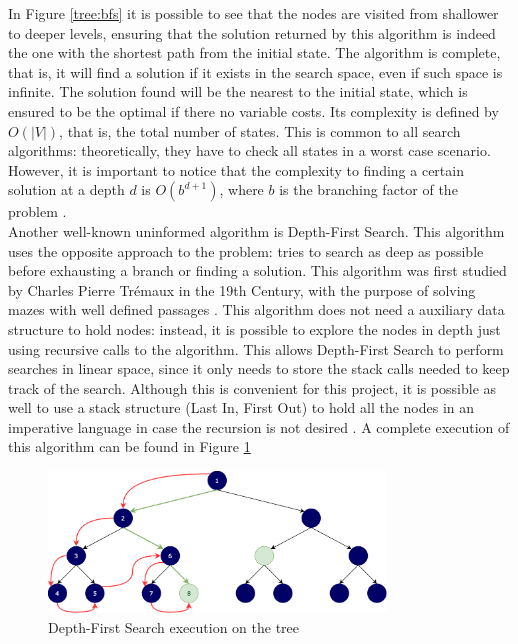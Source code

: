 In Figure \ref{tree:bfs} it is possible to see that the nodes are visited from
shallower to deeper levels, ensuring that the solution returned by this
algorithm is indeed the one with the shortest path from the initial state. The
algorithm is complete, that is, it will find a solution if it exists in the
search space, even if such space is infinite. The solution found will be the
nearest to the initial state, which is ensured to be the optimal if there no
variable costs. Its complexity is defined by $O(|V|)$, that is, the total
number of states. This is common to all search algorithms: theoretically, they
have to check all states in a worst case scenario. However, it is important to
notice that the complexity to finding a certain solution at a depth $d$ is
$O(b^{d+1})$, where $b$ is the branching factor of the problem
\cite{rusell-2003-aima}.\\

Another well-known uninformed algorithm is Depth-First Search. This algorithm
uses the opposite approach to the problem: tries to search as deep as possible
before exhausting a branch or finding a solution. This algorithm was first
studied by Charles Pierre Trémaux in the 19th Century, with the purpose of
solving mazes with well defined passages \cite{even-2011-graph}. This algorithm
does not need a auxiliary data structure to hold nodes: instead, it is possible
to explore the nodes in depth just using recursive calls to the algorithm. This
allows Depth-First Search to perform searches in linear space, since it only
needs to store the stack calls needed to keep track of the search. Although
this is convenient for this project, it is possible as well to use a stack
structure (Last In, First Out) to hold all the nodes in an imperative language
in case the recursion is not desired \cite{rusell-2003-aima}. A complete
execution of this algorithm can be found in Figure \ref{tree:dfs}\\

\begin{figure}[ht]
\centering
\includegraphics[width=0.8\textwidth]{img/dfs.png}
\caption{Depth-First Search execution on the tree}
\label{tree:dfs}
\end{figure}

